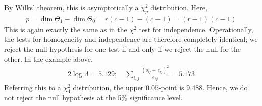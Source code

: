 \begin{example}
	By Wilks' theorem, this is asymptotically a $\chi^2_p$ distribution.
	Here,
	\begin{align*}
		p = \dim \Theta_1 - \dim \Theta_0 = r(c-1) - (c-1) = (r-1)(c-1)
	\end{align*}
	This is again exactly the same as in the $\chi^2$ test for independence.
	Operationally, the tests for homogeneity and independence are therefore completely identical; we reject the null hypothesis for one test if and only if we reject the null for the other.
	In the example above,
	\begin{align*}
		2 \log \Lambda = 5.129;\quad \sum_{i,j} \frac{(o_{ij} - e_{ij})^2}{e_{ij}} = 5.173
	\end{align*}
	Referring this to a $\chi^2_4$ distribution, the upper $0.05$-point is $9.488$.
	Hence, we do not reject the null hypothesis at the 5\% significance level.
\end{example}

